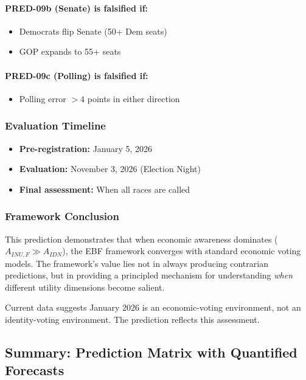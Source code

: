 \paragraph{PRED-09b (Senate) is falsified if:}
\begin{itemize}
    \item Democrats flip Senate (50+ Dem seats)
    \item GOP expands to 55+ seats
\end{itemize}

\paragraph{PRED-09c (Polling) is falsified if:}
\begin{itemize}
    \item Polling error $>4$ points in either direction
\end{itemize}

\subsubsection{Evaluation Timeline}

\begin{itemize}
    \item \textbf{Pre-registration:} January 5, 2026
    \item \textbf{Evaluation:} November 3, 2026 (Election Night)
    \item \textbf{Final assessment:} When all races are called
\end{itemize}

\subsubsection{Framework Conclusion}

This prediction demonstrates that when economic awareness dominates 
($A_{INU,F} \gg A_{IDN}$), the EBF framework converges with standard 
economic voting models. The framework's value lies not in always producing 
contrarian predictions, but in providing a principled mechanism for 
understanding \textit{when} different utility dimensions become salient.

Current data suggests January 2026 is an economic-voting environment, 
not an identity-voting environment. The prediction reflects this assessment.


\subsection{Summary: Prediction Matrix with Quantified Forecasts}
\label{subsec:prediction-summary}

